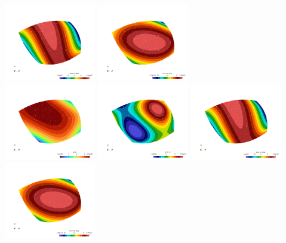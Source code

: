 \begin{center}
\includegraphics[width=4cm]{images/mappings/biquadratic3/elt3/dfdx.0001.png}
\includegraphics[width=4cm]{images/mappings/biquadratic3/elt3/dfdy.0001.png}\\
\includegraphics[width=4cm]{images/mappings/biquadratic3/elt3/jcob.0002.png}
\includegraphics[width=4cm]{images/mappings/biquadratic3/elt3/f.0002.png}
\includegraphics[width=4cm]{images/mappings/biquadratic3/elt3/dfdx.0002.png}
\includegraphics[width=4cm]{images/mappings/biquadratic3/elt3/dfdy.0002.png}\\

\end{center}
